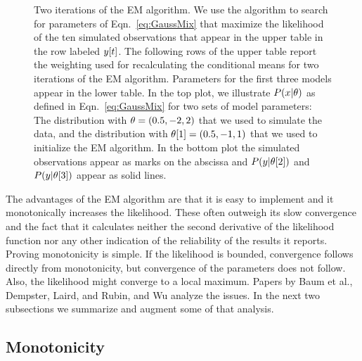 \begin{figure}[htbp]
  \caption[Two iterations of the EM
  algorithm.]%
  {Two iterations of the EM algorithm.  We use the algorithm to search
    for parameters of Eqn.~\eqref{eq:GaussMix} that maximize the
    likelihood of the ten simulated observations that appear in the upper
    table in the row labeled ${y}{[t]}$.  The following rows of the
    upper table report the weighting used for recalculating the
    conditional means for two iterations of the EM algorithm.
    Parameters for the first three models appear in the lower table.
    In the top plot, we illustrate $P(x|\theta)$ as defined in
    Eqn.~\eqref{eq:GaussMix} for two sets of model parameters: The
    distribution with $\theta = (0.5, -2, 2)$ that we used to simulate
    the data, and the distribution with
    ${\theta}{[1]} = (0.5, -1, 1)$ that we used to initialize
    the EM algorithm.  In the bottom plot the simulated observations
    appear as marks on the abscissa and $P(y|{\theta}{[2]})$ and
    $P(y|{\theta}{[3]})$ appear as solid lines.}
  \label{fig:GaussMix}
\end{figure}
\afterpage{\clearpage}%

The advantages of the EM algorithm are that it is easy to implement
and it monotonically increases the likelihood.  These often outweigh
its slow convergence and the fact that it calculates neither the
second derivative of the likelihood function nor any other indication
of the reliability of the results it reports.  Proving monotonicity is
simple.  If the likelihood is bounded, convergence follows directly
from monotonicity, but convergence of the parameters does not follow.
Also, the likelihood might converge to a local maximum.  Papers by
Baum et al.\cite{Baum70}, Dempster, Laird, and Rubin\cite{Dempster77},
and Wu\cite{Wu83} analyze the issues.  In the next two subsections we
summarize and augment some of that analysis.

\subsection{Monotonicity}

